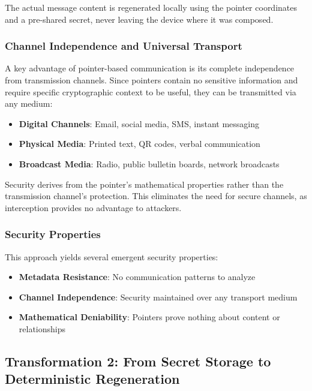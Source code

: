 \documentclass[11pt,a4paper]{article}
\begin{document}
The actual message content is regenerated locally using the pointer coordinates and a pre-shared secret, never leaving the device where it was composed.

\subsubsection{Channel Independence and Universal Transport}

A key advantage of pointer-based communication is its complete independence from transmission channels. Since pointers contain no sensitive information and require specific cryptographic context to be useful, they can be transmitted via any medium:

\begin{itemize}
    \item \textbf{Digital Channels}: Email, social media, SMS, instant messaging
    \item \textbf{Physical Media}: Printed text, QR codes, verbal communication
    \item \textbf{Broadcast Media}: Radio, public bulletin boards, network broadcasts
\end{itemize}

Security derives from the pointer's mathematical properties rather than the transmission channel's protection. This eliminates the need for secure channels, as interception provides no advantage to attackers.

\subsubsection{Security Properties}

This approach yields several emergent security properties:

\begin{itemize}
    \item \textbf{Metadata Resistance}: No communication patterns to analyze
    \item \textbf{Channel Independence}: Security maintained over any transport medium
    \item \textbf{Mathematical Deniability}: Pointers prove nothing about content or relationships
\end{itemize}

\subsection{Transformation 2: From Secret Storage to Deterministic Regeneration}
\end{document}
